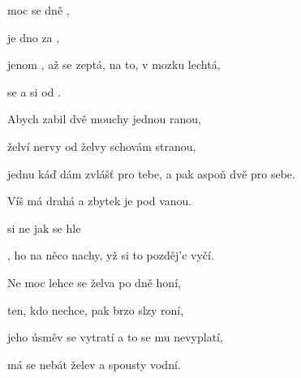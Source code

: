 

\zs
{} moc  se   dně ,   

  je   dno za ,    

{jenom} , až se zeptá, na to,  v mozku lechtá,

 se  a  si  od .   
\ks

\zs
Abych zabil dvě mouchy jednou ranou,

želví nervy od želvy schovám stranou,

jednu káď dám zvlášť pro tebe, a pak aspoň dvě pro sebe.

Víš má drahá a zbytek je pod vanou.
\ks

\zr
{} si   ne jak se   hle

, ho na {něco} nachy, yž si to pozděj’c vyčí.
\kr

\zs
Ne moc lehce se želva po dně honí,

ten, kdo nechce, pak brzo slzy roní,

jeho úsměv se vytratí a to se mu nevyplatí,

má se nebát želev a spousty vodní.
\ks

\zr  \kr

\kp


















